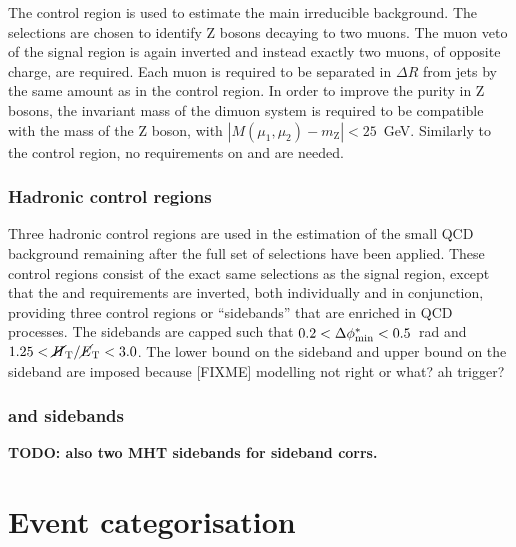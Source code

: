 The \mmj control region is used to estimate the main irreducible \znnj 
background. The selections are chosen to identify Z bosons decaying to two 
muons. The muon veto of the signal region is again inverted and instead exactly 
two muons, of opposite charge, are required. Each muon is required to be 
separated in $\Delta R$ from jets by the same amount as in the \mj control 
region. In order to improve the purity in Z bosons, the invariant mass of the 
dimuon system is required to be compatible with the mass of the Z boson, with 
$|M(\mu_1,\mu_2) - m_\mathrm{Z}| < 25$~GeV. Similarly to the \mj control 
region, no requirements on \alphat and \bdphi are needed.



\subsubsection{Hadronic control regions}

Three hadronic control regions are used in the estimation of the small QCD 
background remaining after the full set of selections have been applied. These 
control regions consist of the exact same selections as the signal region, 
except that the \bdphi and \mhtmet requirements are inverted, both individually 
and in conjunction, providing three control regions or ``sidebands'' that are 
enriched in QCD processes. The sidebands are capped such that 
$0.2<\mbox{$\Delta\phi^{*}_{\mathrm{min}}$}<0.5$~rad and $1.25<\mbox{$\mbox{$\cancel{H}_\text{T}$} / \mbox{$\cancel{E}_\text{T}$}$}<3.0$. The lower bound on the \bdphi 
sideband and upper bound on the \mhtmet sideband are imposed because [FIXME] 
modelling not right or what? ah trigger?

\subsubsection{\mj and \mmj \mht sidebands}
\textbf{TODO: also two MHT sidebands for sideband corrs.}

\section{Event categorisation}
\label{sec:analysis-binning}

